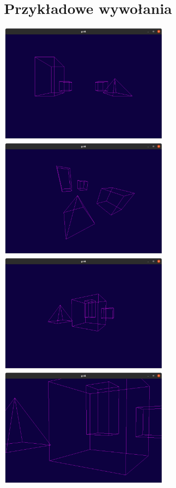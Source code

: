\documentclass[11pt]{article}
\begin{document}
\section{Przykładowe wywołania}
\includegraphics[width=8.5cm]{1.png}
\includegraphics[width=8.5cm]{2.png}
\includegraphics[width=8.5cm]{3.png}
\includegraphics[width=8.5cm]{4.png}
\end{document}
